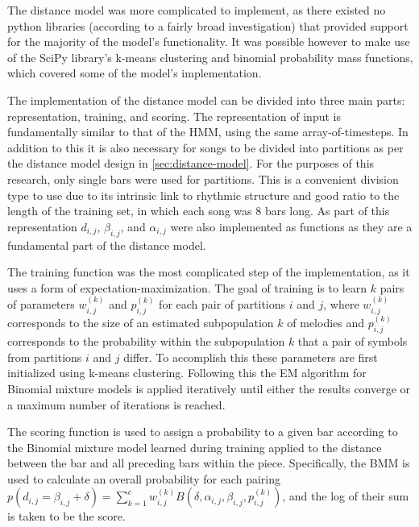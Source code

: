 \documentclass[ author={Stephen Livermore-Tozer},
				supervisor={Dr. Peter Flach},
				degree={MEng},
				title={Algorithmic Co-composition Using Machine Learning},
				subtitle={},
				type={research},
				year={2016} ]{dissertation}
\begin{document}
	The distance model was more complicated to implement, as there existed no python libraries (according to a fairly broad investigation) that provided support for the majority of the model's functionality. It was possible however to make use of the SciPy library's k-means clustering and binomial probability mass functions, which covered some of the model's implementation. 
	
	The implementation of the distance model can be divided into three main parts: representation, training, and scoring. The representation of input is fundamentally similar to that of the HMM, using the same array-of-timesteps. In addition to this it is also necessary for songs to be divided into partitions as per the distance model design in \ref{sec:distance-model}. For the purposes of this research, only single bars were used for partitions. This is a convenient division type to use due to its intrinsic link to rhythmic structure and good ratio to the length of the training set, in which each song was 8 bars long. As part of this representation $d_{i,j}$, $\beta_{i,j}$, and $\alpha_{i,j}$ were also implemented as functions as they are a fundamental part of the distance model.
	
	The training function was the most complicated step of the implementation, as it uses a form of expectation-maximization. The goal of training is to learn $k$ pairs of parameters $w^{(k)}_{i,j}$ and $p^{(k)}_{i,j}$ for each pair of partitions $i$ and $j$, where $w^{(k)}_{i,j}$ corresponds to the size of an estimated subpopulation $k$ of melodies and $p^{(k)}_{i,j}$ corresponds to the probability within the subpopulation $k$ that a pair of symbols from partitions $i$ and $j$ differ. To accomplish this these parameters are first initialized using k-means clustering. Following this the EM algorithm for Binomial mixture models \cite{bilmes1998gentle} is applied iteratively until either the results converge or a maximum number of iterations is reached. 
	
	The scoring function is used to assign a probability to a given bar according to the Binomial mixture model learned during training applied to the distance between the bar and all preceding bars within the piece. Specifically, the BMM is used to calculate an overall probability for each pairing $p(d_{i,j} = \beta_{i,j} + \delta) = \sum_{k=1}^{c} w_{i,j}^{(k)} B(\delta,\alpha_{i,j},\beta_{i,j},p_{i,j}^{(k)})$, and the log of their sum is taken to be the score.
	
\end{document}
